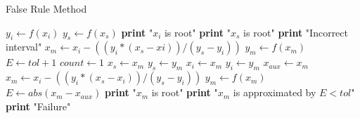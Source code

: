 \documentclass{article}
\begin{document}
  \begin{algorithm}
    \caption{False Rule Method}
    \begin{algorithmic}[1]
        \State $y_{i} \gets f(x_{i})$
        \State $y_{s} \gets f(x_{s})$
          \State \textbf{print} "$x_{i}$ is root"
          \State \textbf{print} "$x_{s}$ is root"
          \State \textbf{print} "Incorrect interval"
        \Else
          \State $x_{m} \gets x_{i} - ((y_{i} * (x_{s} - x{i})) / (y_{s} - y_{i}))$
          \State $y_{m} \gets f(x_{m})$
          \State $E \gets tol + 1$
          \State $count \gets 1$
              \State $x_{s} \gets x_{m}$
              \State $y_{s} \gets y_{m}$
            \Else
              \State $x_{i} \gets x_{m}$
              \State $y_{i} \gets y_{m}$
            \EndIf
            \State $x_{aux} \gets x_{m}$
            \State $x_{m} \gets x_{i} - ((y_{i} * (x_{s} - x_{i})) / (y_{s} - y_{i}))$
            \State $y_{m} \gets f(x_{m})$
            \State $E \gets abs(x_{m} - x_{aux})$
          \EndWhile
            \State \textbf{print} "$x_{m}$ is root"
            \State \textbf{print} "$x_{m}$ is approximated by $E < tol$"
          \Else
            \State \textbf{print} "Failure"
          \EndIf
        \EndIf
      \EndProcedure
    \end{algorithmic}
  \end{algorithm}
\end{document}
